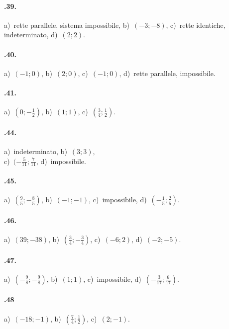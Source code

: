 \begin{multicols}{2}
\paragraph{\thechapter.39.} a)~rette parallele, sistema impossibile, b)~$(-3;-8)$, c)~rette identiche, indeterminato, d)~$(2;2)$.

\paragraph{\thechapter.40.} a)~$\left(-1;0\right)$, b)~$(2;0)$, c)~$\left(-1;0\right)$, d)~rette parallele, impossibile.

\paragraph{\thechapter.41.} a)~$\left(0;-\frac{1}{2}\right)$, b)~$(1;1)$, c)~$\left(\frac{3}{4};\frac{1}{2}\right)$.

\paragraph{\thechapter.44.} a)~indeterminato, b)~$(3;3)$,\protect\\ c)~$(-\frac{5}{11};\frac{7}{11}$, d)~impossibile.

\paragraph{\thechapter.45.} a)~$\left(\frac{9}{5};-\frac{8}{5}\right)$, b)~$(-1;-1)$, c)~impossibile, d)~$\left(-\frac{1}{5};\frac{2}{5}\right)$.

\paragraph{\thechapter.46.} a)~$(39;-38)$, b)~$\left(\frac{3}{4};-\frac{3}{4}\right)$, c)~$(-6;2)$, d)~$(-2;-5)$.

\paragraph{\thechapter.47.} a)~$\left(-\frac{9}{8};-\frac{9}{8}\right)$, b)~$(1;1)$, c)~impossibile, d)~$\left(-\frac{3}{17};\frac{6}{17}\right)$.

\paragraph{\thechapter.48} a)~$(-18;-1)$, b)~$\left(\frac{7}{4};\frac{1}{2}\right)$, c)~$(2;-1)$.


\end{multicols}
